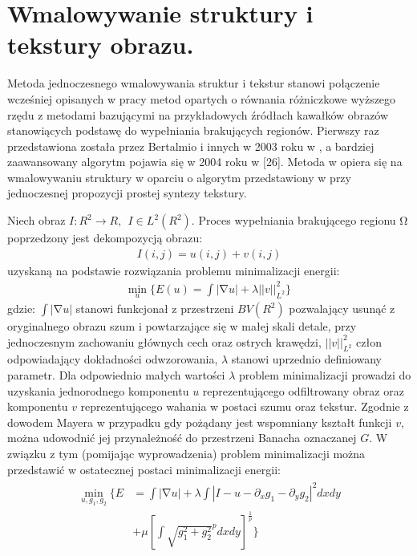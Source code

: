 \documentclass[12pt, twoside, openany]{report}
\theoremstyle{definition}
\begin{document}
\chapter{Wmalowywanie struktury i tekstury obrazu.}
Metoda jednoczesnego wmalowywania struktur i tekstur stanowi połączenie wcześniej opisanych w pracy metod opartych o równania różniczkowe wyższego rzędu z metodami bazującymi na przykładowych źródłach kawałków obrazów stanowiących podstawę do wypełniania brakujących regionów. Pierwszy raz przedstawiona została przez Bertalmio i innych w 2003 roku w \cite{NavierStokesAndTexturePropagation}, a bardziej zaawansowany algorytm pojawia się w 2004 roku w [26]. Metoda w \cite{NavierStokesAndTexturePropagation} opiera się na wmalowywaniu struktury w oparciu o algorytm przedstawiony w \cite{bertalmio2000image} przy jednoczesnej propozycji prostej syntezy tekstury. 
\par
Niech obraz $I:R^2\to R,\ \ I\in L^2(R^2)$. Proces wypełniania brakującego regionu $\mathrm{\Omega }$ poprzedzony jest dekompozycją obrazu:
\begin{align}
I\left(i,j\right)=u\left(i,j\right)+v\left(i,j\right) 
\label{STRUCTURETEXTURE1}
\end{align}
uzyskaną na podstawie rozwiązania problemu minimalizacji energii:
\begin{align} 
{\mathop{\mathrm{min}}_{u} \Biggl\{E\left(u\right)=\int{\left|\mathrm{\nabla }u\right|+\lambda {\left|\left|v\right|\right|}^2_{L^2}}\Biggr\}\ }
\label{STRUCTURETEXTURE2}
\end{align}
gdzie: $\int{\left|\mathrm{\nabla }u\right|}$ stanowi funkcjonał z przestrzeni $BV(R^2)$ pozwalający usunąć z oryginalnego obrazu szum i powtarzające się w małej skali detale, przy jednoczesnym zachowaniu głównych cech oraz ostrych krawędzi, ${\left|\left|v\right|\right|}^2_{L^2}$ człon odpowiadający dokładności odwzorowania, $\lambda $ stanowi uprzednio definiowany parametr. Dla odpowiednio małych wartości $\lambda $ problem minimalizacji prowadzi do uzyskania jednorodnego komponentu $u$ reprezentującego odfiltrowany obraz oraz komponentu $v$ reprezentującego wahania w postaci szumu oraz tekstur. Zgodnie z dowodem Mayera w przypadku gdy pożądany jest wspomniany kształt funkcji $v$, można udowodnić jej  przynależność do przestrzeni Banacha oznaczanej $G$. W związku z tym (pomijając wyprowadzenia) problem minimalizacji można przedstawić w ostatecznej postaci minimalizacji energii:
\begin{align}
\begin{aligned} 
\mathop{\mathrm{min}}_{u,g_1,g_2} \Biggl\{E &= \int{\left|\mathrm{\nabla }u\right|+\lambda \int{{\left|I-u-{\partial }_xg_1-{\partial }_yg_2\right|}^2dxdy}} \\
&+ \mu {\left[\int{{\sqrt{g^2_1+g^2_2}}^pdxdy}\right]}^{\frac{1}{p}}\Biggr\}
\end{aligned}
\end{align}
\end{document}
